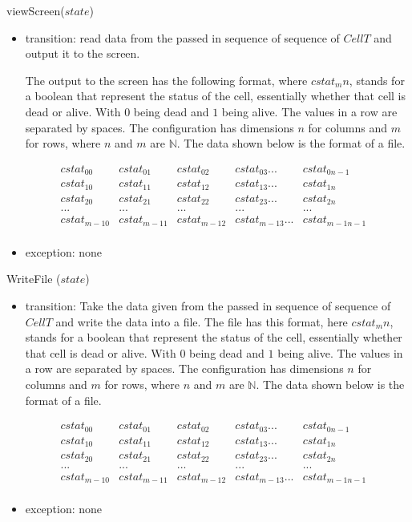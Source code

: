 \documentclass[12pt]{article}
\begin{document}
\noindent viewScreen($state$)
\begin{itemize}
	\item transition: read data from the passed in sequence of sequence of $CellT$ and output it
	to the screen.
	
	The output to the screen has the following format, where $cstat_mn$, stands for a boolean that represent the status of the cell, essentially whether that cell is dead or alive. With $0$ being dead and $1$ being alive. The values in a row are separated by spaces. The configuration has dimensions $n$ for columns and $m$ for rows, where $n$ and $m$ are $\mathbb{N}$. The data shown below is the format of a file.
	
	\begin{equation}
	\begin{array}{ccccccc}
	cstat_{00} & cstat_{01} & cstat_{02} & cstat_{03} ... & cstat_{0n-1} \\
	cstat_{10} & cstat_{11} & cstat_{12} & cstat_{13} ... & cstat_{1n} \\
	cstat_{20} & cstat_{21} & cstat_{22} & cstat_{23} ... & cstat_{2n} \\
	... & ... & ... & ... & ... & \\
	cstat_{m-10} & cstat_{m-11} & cstat_{m-12} & cstat_{m-13} ... & cstat_{m-1n-1}\\
	\end{array}
	\end{equation}
	
	\item exception: none
\end{itemize}

\noindent WriteFile ($state$)
\begin{itemize}
	\item transition: Take the data given from the passed in sequence of sequence of $CellT$ and write the data into a file. The file has this format, here $cstat_mn$, stands for a boolean that represent the status of the cell, essentially whether that cell is dead or alive. With $0$ being dead and $1$ being alive. The values in a row are separated by spaces. The configuration has dimensions $n$ for columns and $m$ for rows, where $n$ and $m$ are $\mathbb{N}$. The data shown below is the format of a file.
	
	\begin{equation}
	\begin{array}{ccccccc}
	cstat_{00} & cstat_{01} & cstat_{02} & cstat_{03} ... & cstat_{0n-1} \\
	cstat_{10} & cstat_{11} & cstat_{12} & cstat_{13} ... & cstat_{1n} \\
	cstat_{20} & cstat_{21} & cstat_{22} & cstat_{23} ... & cstat_{2n} \\
	... & ... & ... & ... & ... & \\
	cstat_{m-10} & cstat_{m-11} & cstat_{m-12} & cstat_{m-13} ... & cstat_{m-1n-1}\\
	\end{array}
	\end{equation}
	\item exception: none
\end{itemize}
\end{document}
